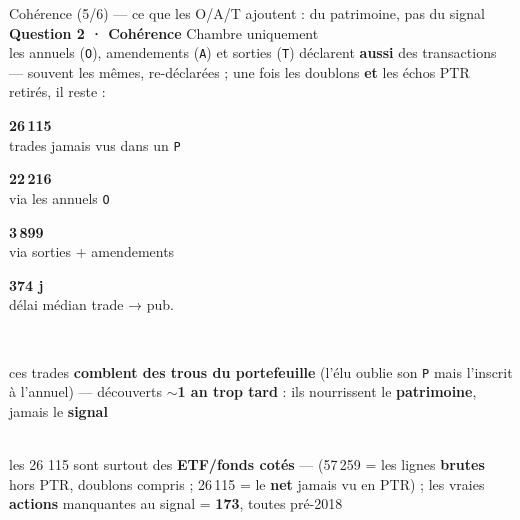 \documentclass[11pt,aspectratio=169]{beamer}
\newcommand{\co}[1]{\texttt{#1}}
\newcommand{\tuile}[3]{%
  \begin{minipage}[t]{0.23\textwidth}\centering
    \colorbox{#1}{\parbox[c][21mm][c]{\dimexpr\linewidth-8pt}{\centering
      {\color{white}\Large\textbf{#2}}\\[0.6mm]
      {\color{white}\footnotesize #3}}}
  \end{minipage}}
\newcommand{\badgel}[2]{\colorbox{#1}{\textcolor{black!80}{\footnotesize\textbf{#2}}}}
\begin{document}
\begin{frame}{Cohérence (5/6) --- ce que les O/A/T ajoutent : du patrimoine, pas du signal}
  \badgel{okgreen!30}{Question 2 · Cohérence}\hfill{\scriptsize\color{black!55} Chambre uniquement}\\[2mm]
  \centering
  {\footnotesize les annuels (\co{O}), amendements (\co{A}) et sorties (\co{T}) déclarent \textbf{aussi} des transactions
   --- souvent les mêmes, re-déclarées ; une fois les doublons \textbf{et} les échos PTR retirés, il reste :}\\[3.5mm]
  \tuile{okgreen}{26\,115}{trades jamais vus dans un \co{P}}\hfill
  \tuile{dataC}{22\,216}{via les annuels \co{O}}\hfill
  \tuile{dataC}{3\,899}{via sorties + amendements}\hfill
  \tuile{grisC}{374 j}{délai médian trade → pub.}\\[3.5mm]
  \colorbox{alertred}{\parbox{0.92\textwidth}{\footnotesize\color{white}\centering
    ces trades \textbf{comblent des trous du portefeuille} (l'élu oublie son \co{P} mais l'inscrit à l'annuel) ---
    découverts \textbf{$\sim$1 an trop tard} : ils nourrissent le \textbf{patrimoine}, jamais le \textbf{signal}}}\\[2mm]
  {\scriptsize\color{black!55} les 26 115 sont surtout des \textbf{ETF/fonds cotés} — (57\,259 = les lignes \textbf{brutes} hors PTR, doublons compris ; 26\,115 = le \textbf{net} jamais vu en PTR) ; les vraies \textbf{actions} manquantes au signal = \textbf{173}, toutes pré-2018}
\end{frame}
\end{document}
